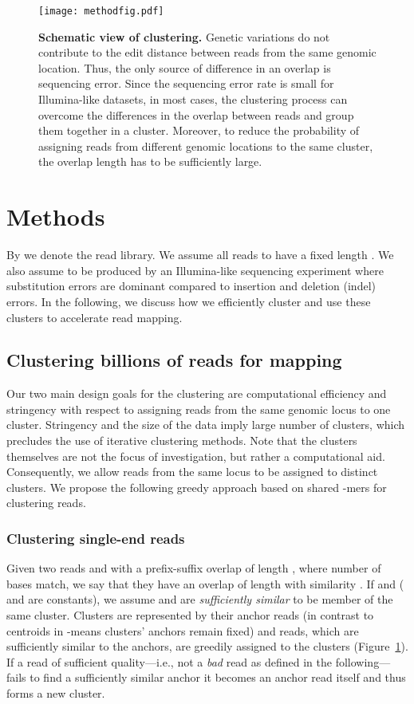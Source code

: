 \documentclass[a4paper]{article}
\begin{document}
\begin{figure}
\centering
\texttt{[image: methodfig.pdf]}
\caption{\label{fig:method}
{\bf Schematic view of clustering.}
Genetic variations do not contribute to the edit distance between reads from the same genomic
location. Thus, the only source of difference in an overlap is sequencing error. Since the sequencing
error rate is small for Illumina-like datasets, in most cases, the clustering process can overcome
the differences in the overlap between reads and group them together in a cluster. Moreover, to
reduce the probability of assigning reads from different genomic locations to the same cluster,
the overlap length has to be sufficiently large.}
\vspace{-4mm}
\end{figure}




\section{Methods}
By  we denote the read library.
We assume all reads to have a fixed length .
We also assume  to be produced by an Illumina-like sequencing experiment where
substitution errors are dominant compared to insertion and deletion (indel)
errors. In the following, we discuss how we efficiently cluster 
and use these clusters to accelerate read mapping.

\subsection{Clustering billions of reads for mapping}
\label{clustering}
Our two main design goals for the clustering are computational efficiency
and stringency with respect to
assigning reads from the same genomic locus
to one cluster. Stringency and the size of the data imply large number of
clusters, which precludes the use of iterative clustering methods. Note
that the clusters themselves are not the focus of investigation, but rather a
computational aid. Consequently, we allow reads from the same locus to be
assigned to distinct clusters. We propose the following greedy approach based
on shared -mers for clustering reads.

\subsubsection{Clustering single-end reads}
Given two reads  and  with a prefix-suffix overlap of length ,
where  number of bases match, we say that they have an overlap of
length  with similarity .
If  and  ( and  are constants),
we assume  and  are \emph{sufficiently similar} to be member of
the same cluster. Clusters are represented by their anchor reads (in
contrast to centroids in -means clusters' anchors remain fixed) and reads,
which are sufficiently similar to the anchors, are greedily assigned to the clusters (Figure~\ref{fig:method}).
If a read of sufficient quality---i.e., not a
{\em bad}
read as defined in the following---fails to
find a sufficiently similar anchor it becomes an anchor read itself and
thus forms a new cluster.
\end{document}
